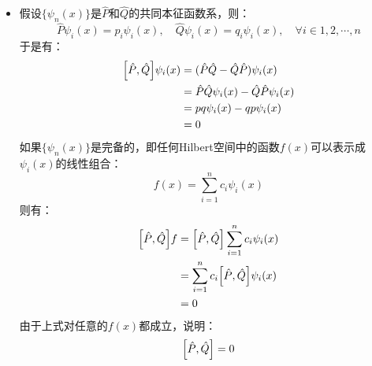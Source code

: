 \documentclass[a4paper,fontset=none]{ctexart}
\begin{document}
\begin{itemize}
        \item[16.]
        假设$\{\psi_n(x)\}$是$\hat{P}$和$\hat{Q}$的共同本征函数系，则：
        \[
            \hat{P}\psi_i(x) = p_i \psi_i(x),\quad \hat{Q}\psi_i(x) = q_i \psi_i(x),\quad \forall i \in {1,2,\cdots,n}
        \]
        于是有：
        \begin{align*}
            \comm{\hat{P}}{\hat{Q}} \psi_i(x)
            &= (\hat{P}\hat{Q} - \hat{Q}\hat{P}) \psi_i(x) \\
            &= \hat{P}\hat{Q}\psi_i(x) - \hat{Q}\hat{P}\psi_i(x) \\
            &= pq\psi_i(x) - qp\psi_i(x) \\
            &= 0
        \end{align*}
        如果$\{\psi_n(x)\}$是完备的，即任何Hilbert空间中的函数$f(x)$可以表示成$\psi_i(x)$的线性组合：
        \[
            f(x) = \sum_{i=1}^n c_i \psi_i(x)
        \]
        则有：
        \begin{align*}
            \comm{\hat{P}}{\hat{Q}}f
            &= \comm{\hat{P}}{\hat{Q}}\sum_{i=1}^n c_i \psi_i(x) \\
            &= \sum_{i=1}^n c_i \comm{\hat{P}}{\hat{Q}} \psi_i(x) \\
            &= 0
        \end{align*}
        由于上式对任意的$f(x)$都成立，说明：
        \[
            \comm{\hat{P}}{\hat{Q}} = 0
        \]
    \end{itemize}
\end{document}
